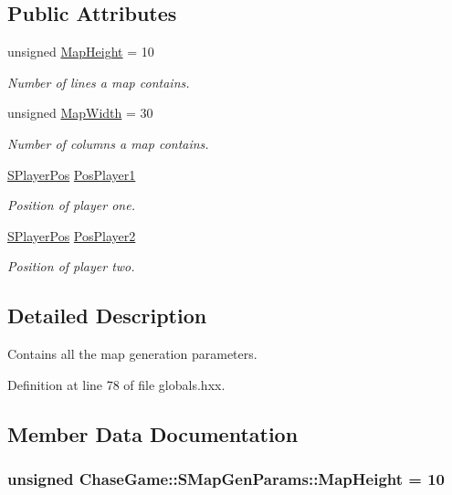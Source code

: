 \subsection*{Public Attributes}
\begin{DoxyCompactItemize}
\item 
unsigned \hyperlink{struct_chase_game_1_1_s_map_gen_params_a772c51dab66176dfe733e4e20cbf85d4}{Map\-Height} = 10
\begin{DoxyCompactList}\small\item\em Number of lines a map contains. \end{DoxyCompactList}\item 
unsigned \hyperlink{struct_chase_game_1_1_s_map_gen_params_a0897aeaa1a1a3a66697a6b441ca8c2de}{Map\-Width} = 30
\begin{DoxyCompactList}\small\item\em Number of columns a map contains. \end{DoxyCompactList}\item 
\hyperlink{struct_chase_game_1_1_s_player_pos}{S\-Player\-Pos} \hyperlink{struct_chase_game_1_1_s_map_gen_params_a8db28a9ee45a200d67b20fc803645501}{Pos\-Player1}
\begin{DoxyCompactList}\small\item\em Position of player one. \end{DoxyCompactList}\item 
\hyperlink{struct_chase_game_1_1_s_player_pos}{S\-Player\-Pos} \hyperlink{struct_chase_game_1_1_s_map_gen_params_afd0a0d4b22e228d547af88d38b6ae963}{Pos\-Player2}
\begin{DoxyCompactList}\small\item\em Position of player two. \end{DoxyCompactList}\end{DoxyCompactItemize}


\subsection{Detailed Description}
Contains all the map generation parameters. 

Definition at line 78 of file globals.\-hxx.



\subsection{Member Data Documentation}
\hypertarget{struct_chase_game_1_1_s_map_gen_params_a772c51dab66176dfe733e4e20cbf85d4}{
\subsubsection[{Map\-Height}]{\setlength{\rightskip}{0pt plus 5cm}unsigned Chase\-Game\-::\-S\-Map\-Gen\-Params\-::\-Map\-Height = 10}}\label{struct_chase_game_1_1_s_map_gen_params_a772c51dab66176dfe733e4e20cbf85d4}


